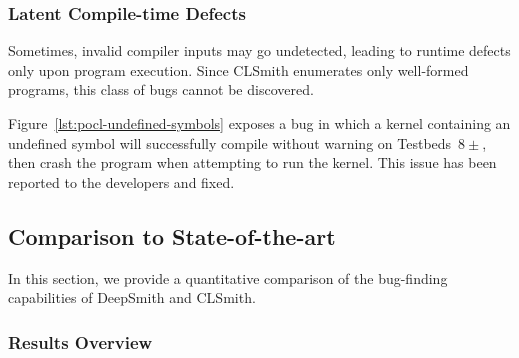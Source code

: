 \subsubsection{Latent Compile-time Defects}

Sometimes, invalid compiler inputs may go undetected, leading to runtime defects
only upon program execution. Since CLSmith enumerates only well-formed programs,
this class of bugs cannot be discovered.

Figure~\ref{lst:pocl-undefined-symbols} exposes a bug in which a kernel
containing an undefined symbol will successfully compile without warning on
Testbeds~$8\pm$, then crash the program when attempting to run the kernel. This
issue has been reported to the developers and fixed.

\subsection{Comparison to State-of-the-art}%
\label{subsec:vs_clsmith}

In this section, we provide a quantitative comparison of the bug-finding
capabilities of DeepSmith and CLSmith.

\subsubsection{Results Overview}

\begin{table}
  \centering %
  \caption[Results from 48 hours of testing using CLSmith]{%
  Results from 48 hours of testing using CLSmith. System \#. as
  per Table~\ref{tab:deepsmith-platforms}. $\pm$ denotes optimisations off ($-$) vs on
  ($+$). The remaining columns denote the number of build crash (\bc), build
  timeout (\bto), anomalous build failure (\abf), anomalous runtime crash
  (\arc), anomalous wrong-output (\awo), and pass (\textbf{\cmark}) results.
  }
  
  \label{tab:megatable}
\end{table}

\begin{table}
	\centering %
	\caption[Results from 48 hours of testing using DeepSmith]{%
		Results from 48 hours of testing using DeepSmith. System \#. as
		per Table~\ref{tab:deepsmith-platforms}. $\pm$ denotes optimisations off ($-$) vs on
		($+$). The remaining columns denote the number of build crash (\bc), build
		timeout (\bto), anomalous build failure (\abf), anomalous runtime crash
		(\arc), anomalous wrong-output (\awo), and pass (\textbf{\cmark}) results.
	}
	
	\label{tab:megatable}
\end{table}

